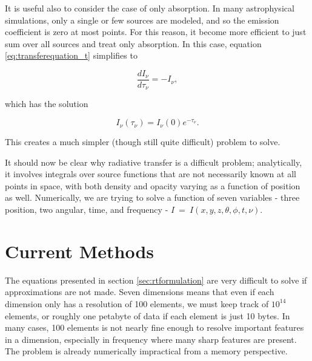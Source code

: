 It is useful also to consider the case of only absorption. In many astrophysical simulations, only a single or few sources are modeled, and so the emission coefficient is zero at most points. For this reason, it become more efficient to just sum over all sources and treat only absorption. In this case, equation \ref{eq:transferequation_t} simplifies to

\begin{equation}
\label{eq:transferequation_abs}
\frac{dI_{\nu}}{d\tau_{\nu}} = -I_{\nu},
\end{equation}

\noindent
which has the solution

\begin{equation}
\label{eq:absorptionsolution}
I_{\nu}(\tau_{\nu}) = I_{\nu}(0)e^{-\tau_{\nu}}.
\end{equation}

This creates a much simpler (though still quite difficult) problem to solve.

It should now be clear why radiative transfer is a difficult problem; analytically, it involves integrals over source functions that are not necessarily known at all points in space, with both density and opacity varying as a function of position as well. Numerically, we are trying to solve a function of seven variables - three position, two angular, time, and frequency - $I~=~I(x,y,z,\theta,\phi,t,\nu)$.

%

\section{Current Methods}
\label{sec:currentmethods}

The equations presented in section \ref{sec:rtformulation} are very difficult to solve if approximations are not made. Seven dimensions means that even if each dimension only has a resolution of 100 elements, we must keep track of $10^{14}$ elements, or roughly one petabyte of data if each element is just 10 bytes. In many cases, 100 elements is not nearly fine enough to resolve important features in a dimension, especially in frequency where many sharp features are present. The problem is already numerically impractical from a memory perspective.

